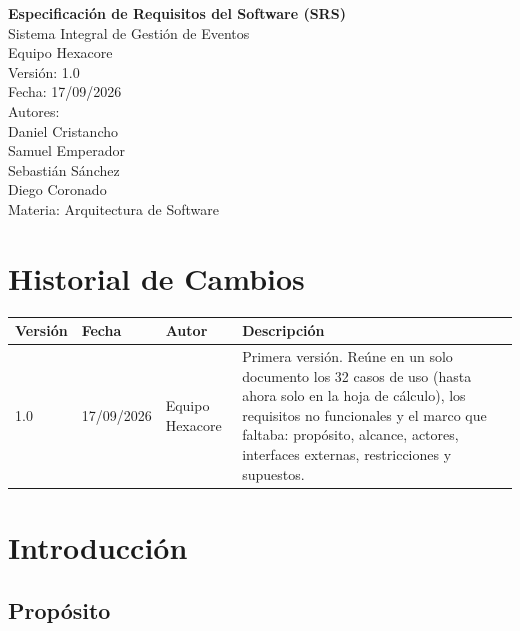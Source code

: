 \documentclass[11pt,a4paper]{article}
\begin{document}
\begin{titlepage}
\centering
\vspace*{2cm}
{\LARGE \textbf{Especificación de Requisitos del Software (SRS)}}\\[0.4cm]
{\Large Sistema Integral de Gestión de Eventos}\\[1.5cm]
{\Large Equipo Hexacore}\\[2cm]
{\large Versión: 1.0}\\[0.5cm]
{\large Fecha: 17/09/2026}\\[2cm]
{\large Autores:}\\
{\large Daniel Cristancho}\\
{\large Samuel Emperador}\\
{\large Sebastián Sánchez}\\
{\large Diego Coronado}\\
\vfill
{\small Materia: Arquitectura de Software}
\end{titlepage}

\section*{Historial de Cambios}

\begin{center}
\begin{tabular}{P{1.6cm}P{2.4cm}P{3.6cm}P{6.4cm}}
\toprule
\textbf{Versión} & \textbf{Fecha} & \textbf{Autor} & \textbf{Descripción}\\
 & 17/09/2026 & Equipo Hexacore & Primera versión. Reúne en un solo documento los 32 casos
de uso (hasta ahora solo en la hoja de cálculo), los requisitos no funcionales y el marco que
faltaba: propósito, alcance, actores, interfaces externas, restricciones y supuestos.\\
\bottomrule
\end{tabular}
\end{center}

\tableofcontents
\newpage

\section{Introducción}

\subsection{Propósito}
\end{document}
